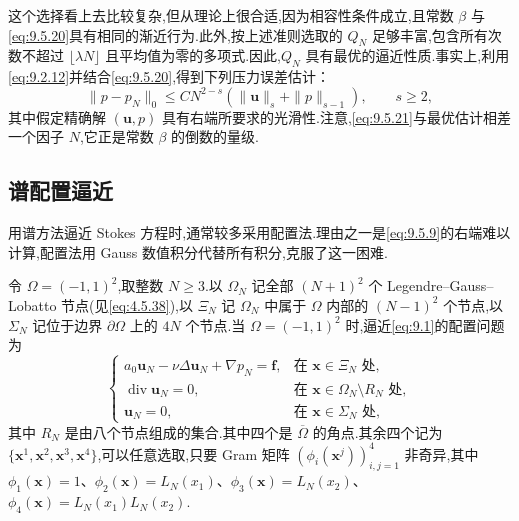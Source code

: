 这个选择看上去比较复杂,但从理论上很合适,因为相容性条件成立,且常数 \(\beta\) 与\eqref{eq:9.5.20}具有相同的渐近行为.此外,按上述准则选取的 \(Q_N\) 足够丰富,包含所有次数不超过 \(\lfloor\lambda N\rfloor\) 且平均值为零的多项式.因此,\(Q_N\) 具有最优的逼近性质.事实上,利用\eqref{eq:9.2.12}并结合\eqref{eq:9.5.20},得到下列压力误差估计：
\begin{equation}\label{eq:9.5.21}
  \|p-p_N\|_0\le CN^{2-s}(\|\boldsymbol{u}\|_s+\|p\|_{s-1}),\qquad s\ge2,
\end{equation}
其中假定精确解 \((\boldsymbol{u},p)\) 具有右端所要求的光滑性.注意,\eqref{eq:9.5.21}与最优估计相差一个因子 \(N\),它正是常数 \(\beta\) 的倒数的量级.

\subsection{谱配置逼近}\label{sec:9.5.2}

用谱方法逼近 Stokes 方程时,通常较多采用配置法.理由之一是\eqref{eq:9.5.9}的右端难以计算,配置法用 Gauss 数值积分代替所有积分,克服了这一困难.

令 \(\Omega=(-1,1)^2\),取整数 \(N\ge3\).以 \(\Omega_N\) 记全部 \((N+1)^2\) 个 Legendre--Gauss--Lobatto 节点(见\eqref{eq:4.5.38}),以 \(\Xi_N\) 记 \(\Omega_N\) 中属于 \(\Omega\) 内部的 \((N-1)^2\) 个节点,以 \(\Sigma_N\) 记位于边界 \(\partial\Omega\) 上的 \(4N\) 个节点.当 \(\Omega=(-1,1)^2\) 时,逼近\eqref{eq:9.1}的配置问题为
\begin{equation}\label{eq:9.5.22}
  \begin{cases}
    a_0\boldsymbol{u}_N-\nu\Delta\boldsymbol{u}_N+\nabla p_N=\boldsymbol{f},
      &\text{在 }\boldsymbol{x}\in\Xi_N\text{ 处},\\
    \operatorname{div}\boldsymbol{u}_N=0,&\text{在 }\boldsymbol{x}\in\Omega_N\setminus R_N\text{ 处},\\
    \boldsymbol{u}_N=0,&\text{在 }\boldsymbol{x}\in\Sigma_N\text{ 处},
  \end{cases}
\end{equation}
其中 \(R_N\) 是由八个节点组成的集合.其中四个是 \(\overline\Omega\) 的角点.其余四个记为 \(\{\boldsymbol{x}^1,\boldsymbol{x}^2,\boldsymbol{x}^3,\boldsymbol{x}^4\}\),可以任意选取,只要 Gram 矩阵 \((\phi_i(\boldsymbol{x}^j))_{i,j=1}^4\) 非奇异,其中
\(\phi_1(\boldsymbol{x})=1\)、\(\phi_2(\boldsymbol{x})=L_N(x_1)\)、\(\phi_3(\boldsymbol{x})=L_N(x_2)\)、\(\phi_4(\boldsymbol{x})=L_N(x_1)L_N(x_2)\).


